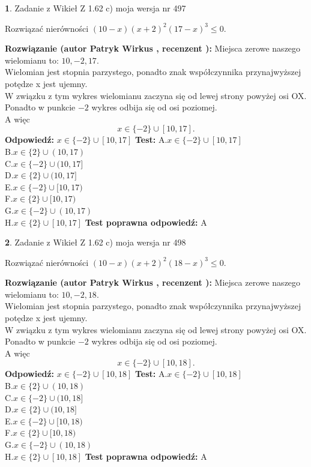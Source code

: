 \documentclass[12pt, a4paper]{article}
\theoremstyle{definition} %
\newtheorem{zad}{}
\newcommand{\zadStart}[1]{\begin{zad}#1\newline}
\newcommand{\zadStop}{\end{zad}}
\newcommand{\rozwStart}[2]{\noindent \textbf{Rozwiązanie (autor #1 , recenzent #2): }\newline}
\newcommand{\rozwStop}{\newline}
\newcommand{\odpStart}{\noindent \textbf{Odpowiedź:}\newline}
\newcommand{\odpStop}{\newline}
\newcommand{\testStart}{\noindent \textbf{Test:}\newline}
\newcommand{\testStop}{\newline}
\newcommand{\kluczStart}{\noindent \textbf{Test poprawna odpowiedź:}\newline}
\newcommand{\kluczStop}{\newline}
\begin{document}
\zadStart{Zadanie z Wikieł Z 1.62 c) moja wersja nr 497}

Rozwiązać nierówności $(10-x)(x+2)^{2}(17-x)^{3}\le0$.
\zadStop
\rozwStart{Patryk Wirkus}{}
Miejsca zerowe naszego wielomianu to: $10, -2, 17$.\\
Wielomian jest stopnia parzystego, ponadto znak współczynnika przy\linebreak najwyższej potędze x jest ujemny.\\ W związku z tym wykres wielomianu zaczyna się od lewej strony powyżej osi OX.\\
Ponadto w punkcie $-2$ wykres odbija się od osi poziomej.\\
A więc $$x \in \{-2\} \cup [10,17].$$
\rozwStop
\odpStart
$x \in \{-2\} \cup [10,17]$
\odpStop
\testStart
A.$x \in \{-2\} \cup [10,17]$\\
B.$x \in \{2\} \cup (10,17)$\\
C.$x \in \{-2\} \cup (10,17]$\\
D.$x \in \{2\} \cup (10,17]$\\
E.$x \in \{-2\} \cup [10,17)$\\
F.$x \in \{2\} \cup [10,17)$\\
G.$x \in \{-2\} \cup (10,17)$\\
H.$x \in \{2\} \cup [10,17]$
\testStop
\kluczStart
A
\kluczStop



\zadStart{Zadanie z Wikieł Z 1.62 c) moja wersja nr 498}

Rozwiązać nierówności $(10-x)(x+2)^{2}(18-x)^{3}\le0$.
\zadStop
\rozwStart{Patryk Wirkus}{}
Miejsca zerowe naszego wielomianu to: $10, -2, 18$.\\
Wielomian jest stopnia parzystego, ponadto znak współczynnika przy\linebreak najwyższej potędze x jest ujemny.\\ W związku z tym wykres wielomianu zaczyna się od lewej strony powyżej osi OX.\\
Ponadto w punkcie $-2$ wykres odbija się od osi poziomej.\\
A więc $$x \in \{-2\} \cup [10,18].$$
\rozwStop
\odpStart
$x \in \{-2\} \cup [10,18]$
\odpStop
\testStart
A.$x \in \{-2\} \cup [10,18]$\\
B.$x \in \{2\} \cup (10,18)$\\
C.$x \in \{-2\} \cup (10,18]$\\
D.$x \in \{2\} \cup (10,18]$\\
E.$x \in \{-2\} \cup [10,18)$\\
F.$x \in \{2\} \cup [10,18)$\\
G.$x \in \{-2\} \cup (10,18)$\\
H.$x \in \{2\} \cup [10,18]$
\testStop
\kluczStart
A
\kluczStop
\end{document}
